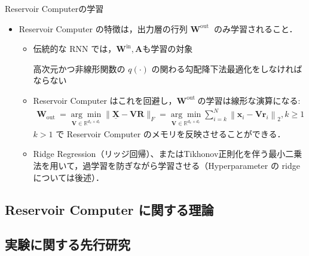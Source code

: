 \begin{frame}{Reservoir Computerの学習}
    \begin{itemize}
        \item Reservoir Computer の特徴は，出力層の行列 $\mathbf{W}^{\text {out }}$ のみ学習されること．\begin{itemize}
            \item 伝統的な RNN では，$\mathbf{W}^{\text {in}}, \mathbf{A}$も学習の対象 
            
            \rightarrow 高次元かつ非線形関数の $q(\cdot)$ の関わる勾配降下法最適化をしなければならない 
            
            \item Reservoir Computer はこれを回避し，$\mathbf{W}^{\text {out }}$の学習は線形な演算になる: 
            \begin{align}
                \mathbf{W}_{\text {out }}=\underset{\mathbf{V} \in \mathbb{R}^{d_x \times d_r}}{\arg \min }\|\underline{\mathbf{X}}-\mathbf{V R}\|_F=\underset{\mathbf{V} \in \mathbb{R}^{d_x \times d_r}}{\arg \min } \sum_{i=k}^N\left\|\mathbf{x}_i-\mathbf{V r}_i\right\|_2, k \geq 1 
            \end{align}
            $k > 1$ で Reservoir Computer のメモリを反映させることができる．
            \item Ridge Regression（リッジ回帰）、またはTikhonov正則化を伴う最小二乗法を用いて，過学習を防ぎながら学習させる（Hyperparameter の ridge については後述）．
        \end{itemize}
    \end{itemize}
\end{frame}

\subsection{Reservoir Computer に関する理論}
\begin{frame}
    
\end{frame}

\subsection{実験に関する先行研究}
\begin{frame}
    
\end{frame}

